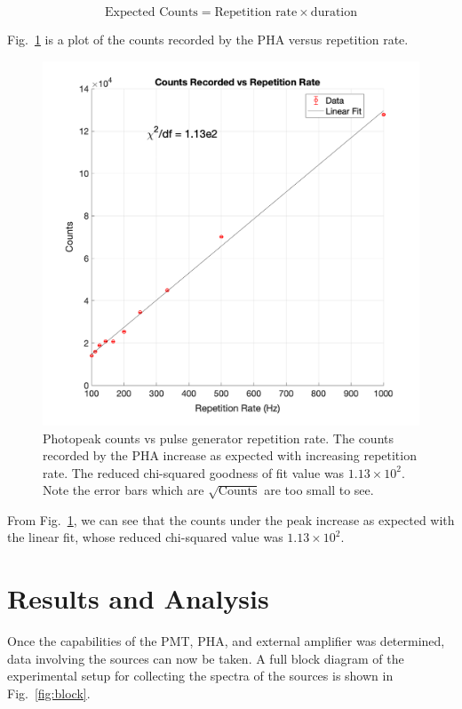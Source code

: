 \documentclass[%
 aip,
rsi,%
 amsmath,amssymb,
 reprint,%
author-numerical,%
]{revtex4-1}
\begin{document}
\begin{equation}
\text{Expected Counts}=\text{Repetition rate}\times \text{duration}
 \label{eq:eight}
\end{equation}

Fig.~\ref{fig:repetitionrate} is a plot of the counts recorded by the PHA versus repetition rate.

\begin{figure}[H]
\includegraphics[width=1\linewidth]{lateximages/repetitionrate.png} 
\caption{\label{fig:repetitionrate} Photopeak counts vs pulse generator repetition rate. The counts recorded by the PHA increase as expected with increasing repetition rate. The reduced chi-squared goodness of fit value was $1.13\times10^2$. Note the error bars which are $\sqrt{\text{Counts}}$ are too small to see. }
\end{figure}

From Fig.~\ref{fig:repetitionrate}, we can see that the counts under the peak increase as expected with the linear fit, whose reduced chi-squared value was $1.13\times10^2$.



\section{Results and Analysis}
Once the capabilities of the PMT, PHA, and external amplifier was determined, data involving the sources can now be taken. A full block diagram of the experimental setup for collecting the spectra of the sources is shown in Fig.~\ref{fig:block}. \newline
\end{document}
